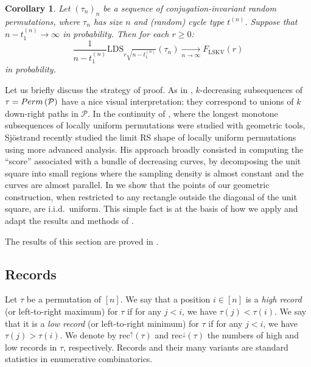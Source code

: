 \documentclass{article}
\newtheorem{cor}[theorem]{Corollary}
\theoremstyle{remark}
\newcommand{\cv}[2]{\underset{#1\to#2}{\longrightarrow}}
\def\LDS{\mathrm{LDS}}
\newcommand{\hrec}[1]{\mathrm{rec}^\uparrow\left(#1\right)}
\newcommand{\lrec}[1]{\mathrm{rec}^\downarrow\left(#1\right)}
\def\pts{\mathcal{P}}
\newcommand{\perm}[1]{{\rm Perm}\left(#1\right)}
\begin{document}
\begin{cor}\label{cor: limit shape conjugation-invariant}
    Let $(\tau_n)_n$ be a sequence of conjugation-invariant random permutations, where $\tau_n$ has size $n$ and (random) cycle type $t^{(n)}$.
    Suppose that $n-t_1^{(n)}\to\infty$ in probability.
    Then for each $r\ge0$:
    \begin{equation*}
        \frac{1}{n-t_1^{(n)}} \LDS_{r\sqrt{n-t_1^{(n)}}}(\tau_n) \cv{n}{\infty} F_\mathrm{LSKV}(r)
    \end{equation*}
    in probability.
\end{cor}

Let us briefly discuss the strategy of proof.
As in , $k$-decreasing subsequences of $\tau = \perm{\pts}$ have a nice visual interpretation:
they correspond to unions of $k$ down-right paths in $\pts$.
In the continuity of \cite{DZ95}, where the longest monotone subsequences of locally uniform permutations were studied with geometric tools, Sj\"ostrand \cite{S23} recently studied the limit RS shape of locally uniform permutations using more advanced analysis.
His approach broadly consisted in computing the ``score'' associated with a bundle of decreasing curves, by decomposing the unit square into small regions where the sampling density is almost constant and the curves are almost parallel.
In  we show that the points of our geometric construction, when restricted to any rectangle outside the diagonal of the unit square, are i.i.d.~uniform.
This simple fact is at the basis of how we apply and adapt the results and methods of \cite{S23}.

The results of this section are proved in .


\subsection{Records}
\label{sec: results records}

Let $\tau$ be a permutation of $[n]$.
We say that a position $i\in[n]$ is a {\em high record} (or left-to-right maximum) for $\tau$ if for any $j<i$, we have $\tau(j)<\tau(i)$.
We say that it is a {\em low record} (or left-to-right minimum) for $\tau$ if for any $j<i$, we have $\tau(j)>\tau(i)$.
We denote by $\hrec{\tau}$ and $\lrec{\tau}$ the numbers of high and low records in $\tau$, respectively.
Records and their many variants are standard statistics in enumerative combinatorics.
\end{document}
